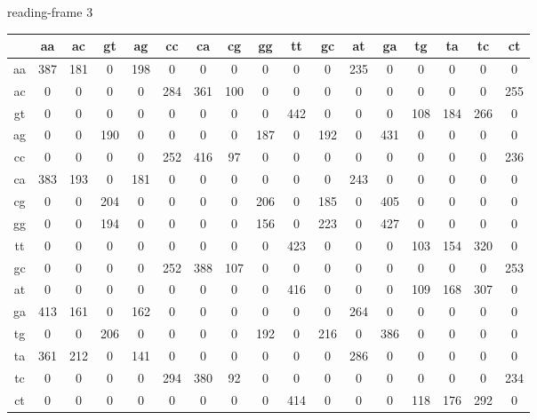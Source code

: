 \documentclass{homework}
\begin{document}
\begin{enumerate}
\begin{enumerate}
\normalsize
reading-frame 3
\tiny

\begin{tabular}{c|cccccccccccccccc}
   & aa & ac & gt & ag & cc & ca & cg & gg & tt & gc & at & ga & tg & ta & tc & ct\\\hline
aa & 387 & 181 &   0 & 198 &   0 &   0 &   0 &   0 &   0 &   0 & 235 &   0 &   0 &   0 &   0 &   0\\
ac &   0 &   0 &   0 &   0 & 284 & 361 & 100 &   0 &   0 &   0 &   0 &   0 &   0 &   0 &   0 & 255\\
gt &   0 &   0 &   0 &   0 &   0 &   0 &   0 &   0 & 442 &   0 &   0 &   0 & 108 & 184 & 266 &   0\\
ag &   0 &   0 & 190 &   0 &   0 &   0 &   0 & 187 &   0 & 192 &   0 & 431 &   0 &   0 &   0 &   0\\
cc &   0 &   0 &   0 &   0 & 252 & 416 &  97 &   0 &   0 &   0 &   0 &   0 &   0 &   0 &   0 & 236\\
ca & 383 & 193 &   0 & 181 &   0 &   0 &   0 &   0 &   0 &   0 & 243 &   0 &   0 &   0 &   0 &   0\\
cg &   0 &   0 & 204 &   0 &   0 &   0 &   0 & 206 &   0 & 185 &   0 & 405 &   0 &   0 &   0 &   0\\
gg &   0 &   0 & 194 &   0 &   0 &   0 &   0 & 156 &   0 & 223 &   0 & 427 &   0 &   0 &   0 &   0\\
tt &   0 &   0 &   0 &   0 &   0 &   0 &   0 &   0 & 423 &   0 &   0 &   0 & 103 & 154 & 320 &   0\\
gc &   0 &   0 &   0 &   0 & 252 & 388 & 107 &   0 &   0 &   0 &   0 &   0 &   0 &   0 &   0 & 253\\
at &   0 &   0 &   0 &   0 &   0 &   0 &   0 &   0 & 416 &   0 &   0 &   0 & 109 & 168 & 307 &   0\\
ga & 413 & 161 &   0 & 162 &   0 &   0 &   0 &   0 &   0 &   0 & 264 &   0 &   0 &   0 &   0 &   0\\
tg &   0 &   0 & 206 &   0 &   0 &   0 &   0 & 192 &   0 & 216 &   0 & 386 &   0 &   0 &   0 &   0\\
ta & 361 & 212 &   0 & 141 &   0 &   0 &   0 &   0 &   0 &   0 & 286 &   0 &   0 &   0 &   0 &   0\\
tc &   0 &   0 &   0 &   0 & 294 & 380 &  92 &   0 &   0 &   0 &   0 &   0 &   0 &   0 &   0 & 234\\
ct &   0 &   0 &   0 &   0 &   0 &   0 &   0 &   0 & 414 &   0 &   0 &   0 & 118 & 176 & 292 &   0\\
\end{tabular}


\end{enumerate}
\end{enumerate}
\end{document}
